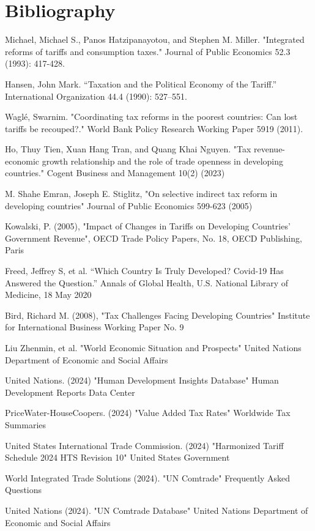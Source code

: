 \documentclass[12pt]{article}
\begin{document}
\newpage
\section*{Bibliography}
\singlespacing
\setlength\bibsep{0pt}

Michael, Michael S., Panos Hatzipanayotou, and Stephen M. Miller. "Integrated reforms of tariffs and consumption taxes." Journal of Public Economics 52.3 (1993): 417-428.

Hansen, John Mark. “Taxation and the Political Economy of the Tariff.” International Organization 44.4 (1990): 527–551.

Waglé, Swarnim. "Coordinating tax reforms in the poorest countries: Can lost tariffs be recouped?." World Bank Policy Research Working Paper 5919 (2011).

Ho, Thuy Tien, Xuan Hang Tran, and Quang Khai Nguyen. "Tax revenue-economic growth relationship and the role of trade openness in developing countries." Cogent Business and Management 10(2) (2023)

M. Shahe Emran, Joseph E. Stiglitz, "On selective indirect tax reform in developing countries" Journal of Public Economics 599-623 (2005)

Kowalski, P. (2005), "Impact of Changes in Tariffs on Developing Countries' Government Revenue", OECD Trade Policy Papers, No. 18, OECD Publishing, Paris

Freed, Jeffrey S, et al. “Which Country Is Truly Developed? Covid-19 Has Answered the Question.” Annals of Global Health, U.S. National Library of Medicine, 18 May 2020

Bird, Richard M. (2008), "Tax Challenges Facing Developing Countries" Institute for International Business Working Paper No. 9

Liu Zhenmin, et al. "World Economic Situation and Prospects" United Nations Department of Economic and Social Affairs

United Nations. (2024) "Human Development Insights Database" Human Development Reports Data Center

PriceWater-HouseCoopers. (2024) "Value Added Tax Rates" Worldwide Tax Summaries 

United States International Trade Commission. (2024) "Harmonized Tariff Schedule 2024 HTS Revision 10" United States Government

World Integrated Trade Solutions (2024). "UN Comtrade" Frequently Asked Questions

United Nations (2024). "UN Comtrade Database" United Nations Department of Economic and Social Affairs
\end{document}
